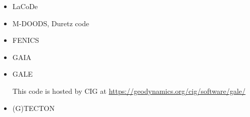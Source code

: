 \begin{itemize}
\item{LaCoDe}  

\cite{demh19}

\item M-DOODS, Duretz code

\cite{yatd12}
\cite{yahb13}
\cite{chmd19}\cite{dual19}

\item FENICS 

\cite{alrk14}


\item GAIA 

\cite{toyu11}
\cite{hutm13}
\cite{neum19}

\item GALE 

This code is hosted by CIG at \url{https://geodynamics.org/cig/software/gale/}

\cite{fabs08}
\cite{gotc08}
\cite{beve10}
\cite{cmwt10}
\cite{lehm12}\cite{liqi12}
\cite{arbi13}

\item (G)TECTON
 


\end{itemize}

